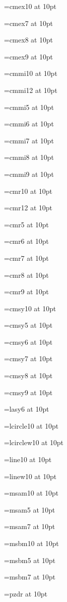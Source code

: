 \documentclass{article}
\begin{document}
{\font\probe=cmex10 at 10pt\probe{}\par}
{\font\probe=cmex7 at 10pt\probe{}\par}
{\font\probe=cmex8 at 10pt\probe{}\par}
{\font\probe=cmex9 at 10pt\probe{}\par}
{\font\probe=cmmi10 at 10pt\probe{}\par}
{\font\probe=cmmi12 at 10pt\probe{}\par}
{\font\probe=cmmi5 at 10pt\probe{}\par}
{\font\probe=cmmi6 at 10pt\probe{}\par}
{\font\probe=cmmi7 at 10pt\probe{}\par}
{\font\probe=cmmi8 at 10pt\probe{}\par}
{\font\probe=cmmi9 at 10pt\probe{}\par}
{\font\probe=cmr10 at 10pt\probe{}\par}
{\font\probe=cmr12 at 10pt\probe{}\par}
{\font\probe=cmr5 at 10pt\probe{}\par}
{\font\probe=cmr6 at 10pt\probe{}\par}
{\font\probe=cmr7 at 10pt\probe{}\par}
{\font\probe=cmr8 at 10pt\probe{}\par}
{\font\probe=cmr9 at 10pt\probe{}\par}
{\font\probe=cmsy10 at 10pt\probe{}\par}
{\font\probe=cmsy5 at 10pt\probe{}\par}
{\font\probe=cmsy6 at 10pt\probe{}\par}
{\font\probe=cmsy7 at 10pt\probe{}\par}
{\font\probe=cmsy8 at 10pt\probe{}\par}
{\font\probe=cmsy9 at 10pt\probe{}\par}
{\font\probe=lasy6 at 10pt\probe{}\par}
{\font\probe=lcircle10 at 10pt\probe{}\par}
{\font\probe=lcirclew10 at 10pt\probe{}\par}
{\font\probe=line10 at 10pt\probe{}\par}
{\font\probe=linew10 at 10pt\probe{}\par}
{\font\probe=msam10 at 10pt\probe{}\par}
{\font\probe=msam5 at 10pt\probe{}\par}
{\font\probe=msam7 at 10pt\probe{}\par}
{\font\probe=msbm10 at 10pt\probe{}\par}
{\font\probe=msbm5 at 10pt\probe{}\par}
{\font\probe=msbm7 at 10pt\probe{}\par}
{\font\probe=pzdr at 10pt\probe{}\par}
\end{document}
